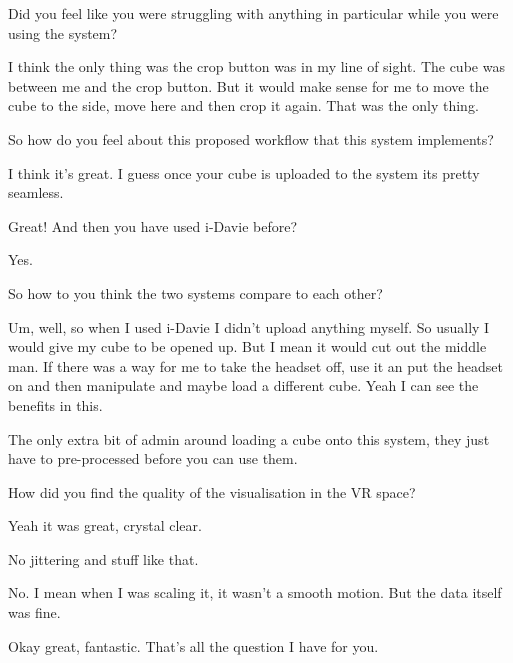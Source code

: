 \begin{description}

\mich Did you feel like you were struggling with anything in particular while you were using the system?

\henco I think the only thing was the crop button was in my line of sight. The cube was between me and the crop button. But it would make sense for me to move the cube to the side, move here and then crop it again. That was the only thing.

\mich So how do you feel about this proposed workflow that this system implements?

\henco I think it's great. I guess once your cube is uploaded to the system its pretty seamless.

\mich Great! And then you have used i-Davie before?

\henco Yes.

\mich So how to you think the two systems compare to each other?

\henco Um, well, so when I used i-Davie I didn't upload anything myself. So usually I would give my cube to be opened up. But I mean it would cut out the middle man. If there was a way for me to take the headset off, use it an put the headset on and then manipulate and maybe load a different cube. Yeah I can see the benefits in this.

\mich The only extra bit of admin around loading a cube onto this system, they just have to pre-processed before you can use them. 

\mich How did you find the quality of the visualisation in the VR space?

\henco Yeah it was great, crystal clear.

\mich No jittering and stuff like that.

\henco No. I mean when I was scaling it, it wasn't a smooth motion. But the data itself was fine.

\mich Okay great, fantastic. That's all the question I have for you.

\end{description}